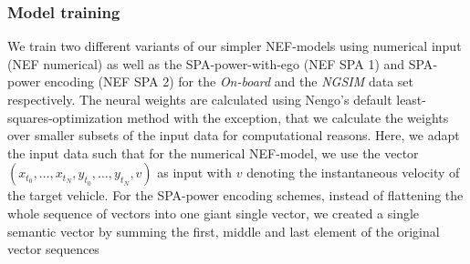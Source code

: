 \subsubsection{Model training}%
\label{ssubsec:model_training_nef}

We train two different variants of our simpler \ac{NEF}-models using numerical input (\acs{NEF} numerical) as well as the \ac{SPA}-power-with-ego (\acs{NEF} \acs{SPA} \num{1}) and \ac{SPA}-power encoding (\acs{NEF} \acs{SPA} \num{2}) for the \emph{On-board} and the \emph{\ac{NGSIM}} data set respectively.
The neural weights are calculated using \acs{Nengo}'s default least-squares-optimization method with the exception, that we calculate the weights over smaller subsets of the input data for computational reasons.
Here, we adapt the input data such that for the numerical \ac{NEF}-model, we use the vector $(x_{t_{0}}, \ldots, x_{t_{N}}, y_{t_{0}}, \ldots, y_{t_{N}}, v)$ as input with $v$ denoting the instantaneous velocity of the target vehicle.
For the \ac{SPA}-power encoding schemes, instead of flattening the whole sequence of vectors into one giant single vector, we created a single semantic vector by summing the first, middle and last element of the original vector sequences

